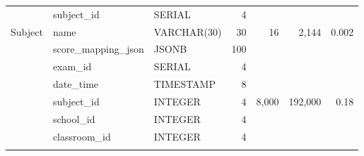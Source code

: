 \documentclass[a4paper]{article}
\begin{document}
{\begin{longtable}{l p{2cm} p{2cm} r r r r}
            \multirow{3}{*}{Subject}
                              & subject\_id          & SERIAL               & 4                     & \multirow{3}{*}{16}        & \multirow{3}{*}{2,144}        & \multirow{3}{*}{0.002}   \\
                              & name                 & VARCHAR(30)          & 30                    &                            &                               &                          \\
                              & score\_mapping\_json & JSONB                & 100                   &                            &                               &                          \\ \addlinespace
            \hline

            \multirow{5}{*}{Exam}
                              & exam\_id             & SERIAL               & 4                     & \multirow{5}{*}{8,000}     & \multirow{5}{*}{192,000}      & \multirow{5}{*}{0.18}    \\
                              & date\_time           & TIMESTAMP            & 8                     &                            &                               &                          \\
                              & subject\_id          & INTEGER              & 4                     &                            &                               &                          \\
                              & school\_id           & INTEGER              & 4                     &                            &                               &                          \\
                              & classroom\_id        & INTEGER              & 4                     &                            &                               &                          \\ \addlinespace



\end{longtable}}
\end{document}
